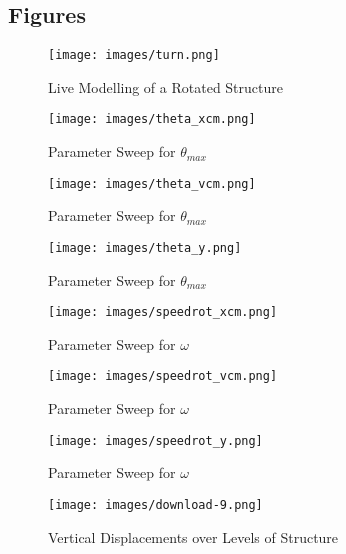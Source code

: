 \documentclass{article}
\begin{document}
\subsection{Figures}
\begin{figure}[h!]
\texttt{[image: images/turn.png]}
\caption{Live Modelling of a Rotated Structure}
\centering
\end{figure}
\begin{figure}[h!]
\texttt{[image: images/theta\_xcm.png]}
\caption{Parameter Sweep for $\theta_{max}$}
\centering
\end{figure}
\begin{figure}[h!]
\texttt{[image: images/theta\_vcm.png]}
\caption{Parameter Sweep for $\theta_{max}$}
\centering
\end{figure}
\begin{figure}[h!]
\texttt{[image: images/theta\_y.png]}
\caption{Parameter Sweep for $\theta_{max}$}
\centering
\end{figure}
\begin{figure}[h!]
\texttt{[image: images/speedrot\_xcm.png]}
\caption{Parameter Sweep for $\omega$}
\centering
\end{figure}
\begin{figure}[h!]
\texttt{[image: images/speedrot\_vcm.png]}
\caption{Parameter Sweep for $\omega$}
\centering
\end{figure}
\newpage \newpage
\begin{figure}[h!]
\texttt{[image: images/speedrot\_y.png]}
\caption{Parameter Sweep for $\omega$}
\centering
\end{figure}
\begin{figure}[h!]
\texttt{[image: images/download-9.png]}
\caption{Vertical Displacements over Levels of Structure}
\centering
\end{figure}
\end{document}
